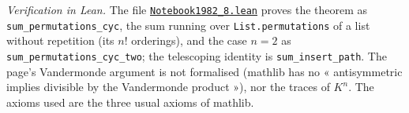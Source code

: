 \emph{Verification in Lean.} The file \href{\leanblobmain/Notebook1982_8.lean}{\texttt{Notebook1982\_8.\allowbreak{}lean}} proves the theorem as \texttt{sum\_permutations\_cyc}, the sum running over \texttt{List.permutations} of a list without repetition (its $n!$ orderings), and the case $n = 2$ as \texttt{sum\_permutations\_cyc\_two}; the telescoping identity is \texttt{sum\_insert\_path}. The page's Vandermonde argument is not formalised (mathlib has no « antisymmetric implies divisible by the Vandermonde product »), nor the traces of $K^n$. The axioms used are the three usual axioms of mathlib.

